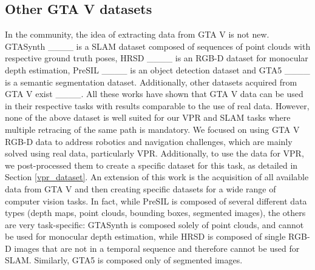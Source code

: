 \subsection{Other GTA V datasets}
In the community, the idea of extracting data from GTA V is not new. GTASynth ____ is a SLAM dataset composed of sequences of point clouds with respective ground truth poses, HRSD ____ is an RGB-D dataset for monocular depth estimation, PreSIL ____ is an object detection dataset and GTA5 ____ is a semantic segmentation dataset. Additionally, other datasets acquired from GTA V exist ____. All these works have shown that GTA V data can be used in their respective tasks with results comparable to the use of real data. However, none of the above dataset is well suited for our VPR and SLAM tasks where multiple retracing of the same path is mandatory.
We focused on using GTA V RGB-D data to address robotics and navigation challenges, which are mainly solved using real data, particularly VPR. Additionally, to use the data for VPR, we post-processed them to create a specific dataset for this task, as detailed in Section \ref{vpr_dataset}.
An extension of this work is the acquisition of all available data from GTA V and then creating specific datasets for a wide range of computer vision tasks. In fact, while PreSIL is composed of several different data types (depth maps, point clouds, bounding boxes, segmented images), the others are very task-specific: GTASynth is composed solely of point clouds, and cannot be used for monocular depth estimation, while HRSD is composed of single RGB-D images that are not in a temporal sequence and therefore cannot be used for SLAM. Similarly, GTA5 is composed only of segmented images.